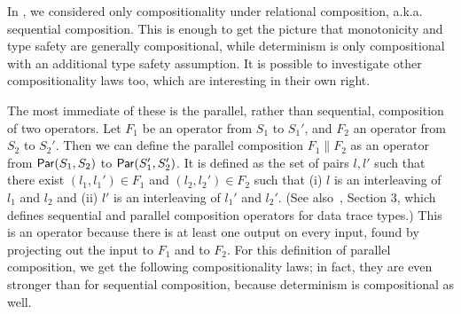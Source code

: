 In , we considered only compositionality under relational composition, a.k.a. sequential composition. This is enough to get the picture that monotonicity and type safety are generally compositional, while determinism is only compositional with an additional type safety assumption.
It is possible to investigate other compositionality laws too, which are interesting in their own right.

The most immediate of these is the parallel, rather than sequential, composition of two operators. Let $F_1$ be an operator from $S_1$ to $S_1'$, and $F_2$ an operator from $S_2$ to $S_2'$.
Then we can define the parallel composition $F_1 \| F_2$ as
an operator from $\mathsf{Par}({S_1}, {S_2})$ to $\mathsf{Par}({S_1'}, {S_2'})$.
It is defined as the set of pairs $l, l'$ such that there exist $(l_1, l_1') \in F_1$ and $(l_2, l_2') \in F_2$ such that (i) $l$ is an interleaving of $l_1$ and $l_2$ and (ii) $l'$ is an interleaving of $l_1'$ and $l_2'$.
(See also~, Section 3, which defines sequential and parallel composition operators for data trace types.)
This is an operator because there is at least one output on every input, found by projecting out the input to $F_1$ and to $F_2$.
For this definition of parallel composition, we get the following compositionality laws; in fact, they are even stronger than for sequential composition,
because determinism is compositional as well.

